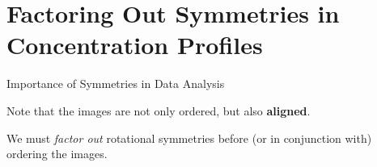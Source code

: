\section[Factoring Out Symmetries in Concentration Profiles]{Factoring Out Symmetries in Concentration Profiles}

\begin{frame}{Importance of Symmetries in Data Analysis}
	
	\drawunordered
	
	\drawdownarrow
	
	\draworderedvdm
	    
	Note that the images are not only ordered, but also {\bf aligned}.
	
	We must {\em factor out} rotational symmetries before (or in conjunction with) ordering the images. 
	

\end{frame}

%
%	
%	
%	
%	
%


